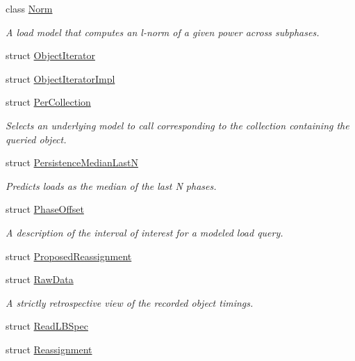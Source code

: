 \begin{DoxyCompactItemize}
\item 
class \hyperlink{classvt_1_1vrt_1_1collection_1_1balance_1_1_norm}{Norm}
\begin{DoxyCompactList}\small\item\em A load model that computes an l-\/norm of a given power across subphases. \end{DoxyCompactList}\item 
struct \hyperlink{structvt_1_1vrt_1_1collection_1_1balance_1_1_object_iterator}{Object\+Iterator}
\item 
struct \hyperlink{structvt_1_1vrt_1_1collection_1_1balance_1_1_object_iterator_impl}{Object\+Iterator\+Impl}
\item 
struct \hyperlink{structvt_1_1vrt_1_1collection_1_1balance_1_1_per_collection}{Per\+Collection}
\begin{DoxyCompactList}\small\item\em Selects an underlying model to call corresponding to the collection containing the queried object. \end{DoxyCompactList}\item 
struct \hyperlink{structvt_1_1vrt_1_1collection_1_1balance_1_1_persistence_median_last_n}{Persistence\+Median\+LastN}
\begin{DoxyCompactList}\small\item\em Predicts loads as the median of the last N phases. \end{DoxyCompactList}\item 
struct \hyperlink{structvt_1_1vrt_1_1collection_1_1balance_1_1_phase_offset}{Phase\+Offset}
\begin{DoxyCompactList}\small\item\em A description of the interval of interest for a modeled load query. \end{DoxyCompactList}\item 
struct \hyperlink{structvt_1_1vrt_1_1collection_1_1balance_1_1_proposed_reassignment}{Proposed\+Reassignment}
\item 
struct \hyperlink{structvt_1_1vrt_1_1collection_1_1balance_1_1_raw_data}{Raw\+Data}
\begin{DoxyCompactList}\small\item\em A strictly retrospective view of the recorded object timings. \end{DoxyCompactList}\item 
struct \hyperlink{structvt_1_1vrt_1_1collection_1_1balance_1_1_read_l_b_spec}{Read\+L\+B\+Spec}
\item 
struct \hyperlink{structvt_1_1vrt_1_1collection_1_1balance_1_1_reassignment}{Reassignment}

\end{DoxyCompactItemize}
